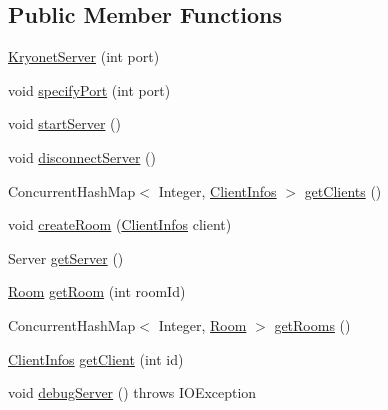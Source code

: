 \subsection*{Public Member Functions}
\begin{DoxyCompactItemize}
\item 
\mbox{\hyperlink{classServer_1_1ServerConnexion_1_1KryonetServer_a2882e79befe13a8c4d03316ee7e4629c}{Kryonet\+Server}} (int port)
\item 
void \mbox{\hyperlink{classServer_1_1ServerConnexion_1_1KryonetServer_a5462e9f47eb97acd2d8353c825bf9f3b}{specify\+Port}} (int port)
\item 
void \mbox{\hyperlink{classServer_1_1ServerConnexion_1_1KryonetServer_a8bad9bf2baafbe83e2a6153c22b86bae}{start\+Server}} ()
\item 
void \mbox{\hyperlink{classServer_1_1ServerConnexion_1_1KryonetServer_a9ee03f7e9a0b2d685f4e70af32a8204e}{disconnect\+Server}} ()
\item 
Concurrent\+Hash\+Map$<$ Integer, \mbox{\hyperlink{classServer_1_1ServerConnexion_1_1ClientInfos}{Client\+Infos}} $>$ \mbox{\hyperlink{classServer_1_1ServerConnexion_1_1KryonetServer_a49d513edab305edc72d56d173dd44ad3}{get\+Clients}} ()
\item 
void \mbox{\hyperlink{classServer_1_1ServerConnexion_1_1KryonetServer_ac594217673743346d963fa9e04f7a9dc}{create\+Room}} (\mbox{\hyperlink{classServer_1_1ServerConnexion_1_1ClientInfos}{Client\+Infos}} client)
\item 
Server \mbox{\hyperlink{classServer_1_1ServerConnexion_1_1KryonetServer_a2fc9a796907080bcbe65ec24304cca42}{get\+Server}} ()
\item 
\mbox{\hyperlink{classServer_1_1ServerConnexion_1_1Room}{Room}} \mbox{\hyperlink{classServer_1_1ServerConnexion_1_1KryonetServer_a4f294be7cbfd6a2c94191d3c488a9a12}{get\+Room}} (int room\+Id)
\item 
Concurrent\+Hash\+Map$<$ Integer, \mbox{\hyperlink{classServer_1_1ServerConnexion_1_1Room}{Room}} $>$ \mbox{\hyperlink{classServer_1_1ServerConnexion_1_1KryonetServer_ae0ff8432defb56e7801cac76e92c208d}{get\+Rooms}} ()
\item 
\mbox{\hyperlink{classServer_1_1ServerConnexion_1_1ClientInfos}{Client\+Infos}} \mbox{\hyperlink{classServer_1_1ServerConnexion_1_1KryonetServer_a0bc98a11530ff1d8734c29c7452b92f4}{get\+Client}} (int id)
\item 
void \mbox{\hyperlink{classServer_1_1ServerConnexion_1_1KryonetServer_acf5490a67284ed588a2167a12559ac5f}{debug\+Server}} ()  throws I\+O\+Exception 
\end{DoxyCompactItemize}


